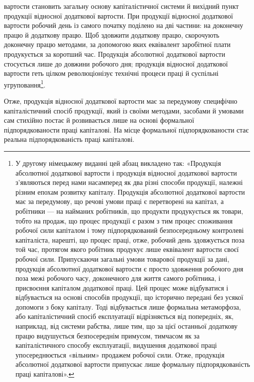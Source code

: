 \parcont{}  %
вартости становить загальну основу капіталістичної системи
й вихідний пункт продукції відносної додаткової вартости. При
продукції відносної додаткової вартости робочий день із самого
початку поділено на дві частини: на доконечну працю й додаткову
працю. Щоб здовжити додаткову працю, скорочують доконечну
працю методами, за допомогою яких еквівалент заробітної
плати продукується за коротший час. Продукція абсолютної
додаткової вартости стосується лише до довжини робочого дня;
продукція відносної додаткової вартости геть цілком революціонізує
технічні процеси праці й суспільні угруповання\footnote*{
У другому німецькому виданні цей абзац викладено так: «Продукція
абсолютної додаткової вартости і продукція відносної додаткової
вартости з’являються перед нами насамперед як два різні способи продукції,
належні різним епохам розвитку капіталу. Продукція абсолютної
додаткової вартости має за передумову, що речові умови праці є перетворені
на капітал, а робітники — на найманих робітників, що продукти
продукується як товари, тобто на продаж, що процес продукції є разом
з тим процес споживання робочої сили капіталом і тому підпорядкований
безпосередньому контролеві капіталіста, нарешті, що процес праці, отже,
робочий день здовжується поза той час, протягом якого робітник продукує
лише еквівалент вартости своєї робочої сили. Припускаючи загальні
умови товарової продукції за дані, продукція абсолютної додаткової вартости
є просто здовження робочого дня поза межі робочого часу, доконечного
для життя самого робітника, і присвоєння капіталом додаткової
праці. Цей процес може відбуватися і відбувається на основі способів
продукції, що історично передані без усякої допомоги з боку капіталу.
Тоді відбувається лише формальна метаморфоза, або капіталістичний
спосіб експлуатації відрізняється від попередніх, як, наприклад, від
системи рабства, лише тим, що за цієї останньої додаткову працю видушується
безпосереднім примусом, тимчасом як за капіталістичного способу
експлуатації, видушення додаткової праці упосереднюється «вільним»
продажем робочої сили. Отже, продукція абсолютної додаткової
вартости припускає лише формальну підпорядкованість праці капіталові». 
}.

Отже, продукція відносної додаткової вартости має за передумову
специфічно капіталістичний спосіб продукції, який із
своїми методами, засобами й умовами сам стихійно постає й розвивається
лише на основі формальної підпорядкованости праці
капіталові. На місце формальної підпорядкованости стає реальна
підпорядкованість праці капіталові.

